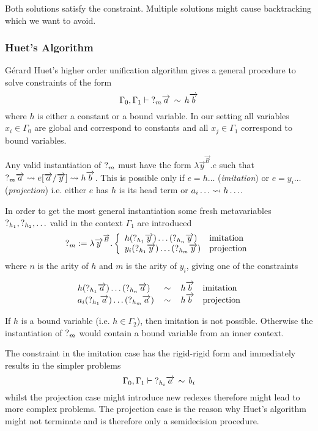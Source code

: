 Both solutions satisfy the constraint. Multiple solutions might cause
backtracking which we want to avoid.




\subsubsection{Huet's Algorithm}
Gérard Huet's higher order unification algorithm gives a general procedure to
solve constraints of the form
$$
    \Gamma_0, \Gamma_1
    \vdash
    {?_{m}} {\overrightarrow {a}} \, \sim \, h {\overrightarrow {b}}
$$
where $h$ is either a constant or a bound variable. In our setting all variables
$x_i \in \Gamma_0$ are global and correspond to constants and all $x_j
\in \Gamma_1$ correspond to bound variables.

Any valid instantiation of ${?_{m}}$ must have the form
    $\lambda \vec y^{\vec B}. e$
such that
    ${?_{m}} {\overrightarrow {a}} \leadsto e[{\overrightarrow {a}}/{\overrightarrow {y}}] \leadsto h {\overrightarrow {b}}$.
%
This is possible only if
    $e = h \ldots$ (\emph{imitation}) or
    $e = y_i \ldots$ (\emph{projection})
i.e. either $e$ has $h$ is its head term or
    $a_i \ldots \leadsto h \ldots$.


In order to get the most general instantiation some fresh metavariables ${?_{h_1}}, {?_{h_2}}, \ldots$ valid in the context $\Gamma_1$ are introduced
$$
    {?_{m}}
    := \lambda {\overrightarrow {y}}^{{\overrightarrow {B}}}.
    \left\{ \begin{array}{lllll} 
        h ({?_{h_1}} {\overrightarrow {y}}) \ldots ({?_{h_n}} {\overrightarrow {y}})
        & \text{imitation}
        \\
        y_i ({?_{h_1}} {\overrightarrow {y}}) \ldots ({?_{h_m}} {\overrightarrow {y}})
        & \text{projection}
     \end{array} \right.
$$
%
where $n$ is the arity of $h$ and $m$ is the arity of $y_i$,
giving one of the constraints

$$
\begin{array}{lllll} 
    h ({?_{h_1}} {\overrightarrow {a}}) \ldots ({?_{h_n}} {\overrightarrow {a}})
    &\, \sim \,&
    h {\overrightarrow {b}}
    & \text{imitation}
    \\
    a_i ({?_{h_1}} {\overrightarrow {a}}) \ldots ({?_{h_m}} {\overrightarrow {a}})
    &\, \sim \,&
    h {\overrightarrow {b}}
    & \text{projection}
 \end{array}
$$

If $h$ is a bound variable (i.e. $h\in \Gamma_2$), then imitation is not
possible. Otherwise the instantiation of ${?_{m}}$ would contain a bound
variable from an inner context.

The constraint in the imitation case has the rigid-rigid form and immediately
results in the simpler problems
$$
    \Gamma_0, \Gamma_1 \vdash {?_{h_i}} {\overrightarrow {a}} \, \sim \, b_i
$$
whilst the projection case might introduce new redexes therefore might lead to
more complex problems. The projection case is the reason why Huet's algorithm
might not terminate and is therefore only a semidecision procedure.

